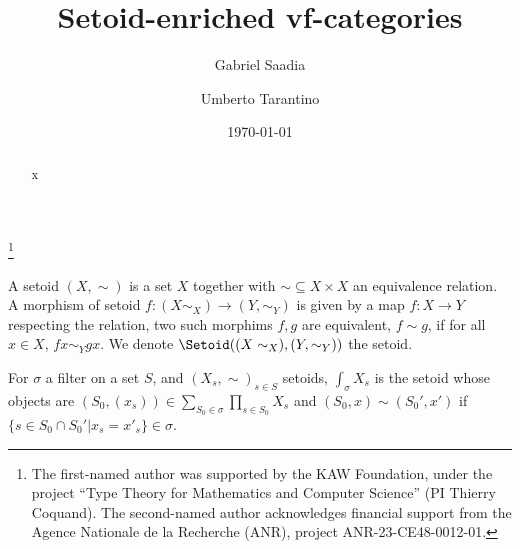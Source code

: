 


\title{Setoid-enriched vf-categories}

\date{\today}

\author{Gabriel Saadia}
\author{Umberto Tarantino}

\address{
Gabriel \textsc{Saadia} \newline
Department of Mathematics\newline
Stockholm University\newline
Stockholm, Sweden\newline
{}
}

\address{
Umberto \textsc{Tarantino} \newline
Université Paris Cité, CNRS, IRIF, F-75013\newline
Paris, France\newline
\href{mailto:tarantino@irif.fr}{\sf tarantino@irif.fr}
}


\thanks{The first-named author was supported by the KAW Foundation, under the project “Type Theory for Mathematics and Computer Science” (PI Thierry Coquand). The second-named author acknowledges financial support from the Agence Nationale de la Recherche
(ANR), project ANR-23-CE48-0012-01.}



\begin{abstract}
    x
\end{abstract}

\maketitle
\setcounter{tocdepth}{2} 
\tableofcontents

\begin{defn}
    A setoid $(X,\sim)$ is a set $X$ together with $\sim\subseteq X\times X$ an equivalence relation. A morphism of setoid $f : (X\sim_X)\to(Y,\sim_Y)$ is given by a map $f : X\to Y$ respecting the relation, two such morphims $f,g$ are equivalent, $f\sim g$, if for all $x\in X$, $fx\sim_Y gx$. We denote $\Setoid((X\sim_X),(Y,\sim_Y))$ the setoid.
\end{defn}

\begin{defn}
    For $\sigma$ a filter on a set $S$, and $(X_s,\sim)_{s\in S}$ setoids, $\int_{\sigma}X_s$ is the setoid  whose objects are $(S_0, (x_s)) \in \sum_{S_0\in\sigma}\prod_{s\in S_0}X_{s}$ and $(S_0,x)\sim(S_0',x')$ if $\{s\in S_0\cap S_0' | x_s = x'_s\}\in \sigma$.
\end{defn}

